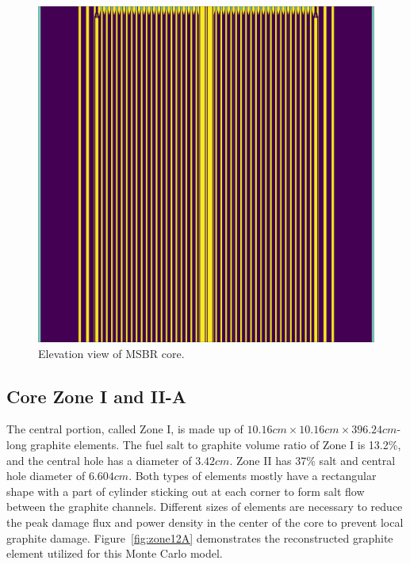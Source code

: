 \documentclass{anstrans}
\begin{document}
\begin{figure}[ht] %
  \centering
  \includegraphics[width=\linewidth]{figure_2_2.png}
  \caption{Elevation view of MSBR core.}
  \label{fig:elevation}
\end{figure}

\subsection{Core Zone I and II-A}
The central portion, called Zone I, is made up of $10.16cm\times10.16cm\times396.24cm$-long graphite elements. The fuel salt to graphite volume ratio of Zone I is 13.2\%, and the central hole has a diameter of $3.42cm$. Zone II has 37\% salt and central hole diameter of $6.604cm$. Both types of elements mostly have a rectangular shape with a part of cylinder sticking out at each corner to form salt flow between the graphite channels. Different sizes of elements are necessary to reduce the peak damage flux and power density in the center of the core to prevent local graphite damage. Figure~\ref{fig:zone12A} demonstrates the reconstructed graphite element utilized for this Monte Carlo model.
\end{document}
